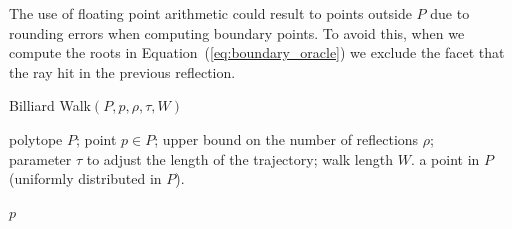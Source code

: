    \fi 

   The use of floating point arithmetic could result to points outside $P$ due to rounding errors when computing boundary points. 
   To avoid this, when we compute the roots in Equation~(\ref{eq:boundary_oracle}) we exclude the facet that the ray hit in the previous reflection.


   \begin{algorithm}[!htp]
      \centering
      \caption{Billiard Walk$(P, p, \rho, \tau, W)$}      
      \label{alg:billiard}
      \medskip
      \begin{algorithmic}
         \REQUIRE polytope $P$; point $p \in P$; upper bound on the number of reflections
         $\rho$; \\ parameter $\tau$ to adjust the length of the trajectory; walk length $W$.
         \ENSURE a point in $P$ (uniformly distributed in $P$).
          

         \ENDIF
         
            


         \ENDWHILE
      
         \ELSE	
         \ENDIF
         

         \ENDFOR

      \RETURN $p$\;


      \end{algorithmic}
         
   \end{algorithm}

